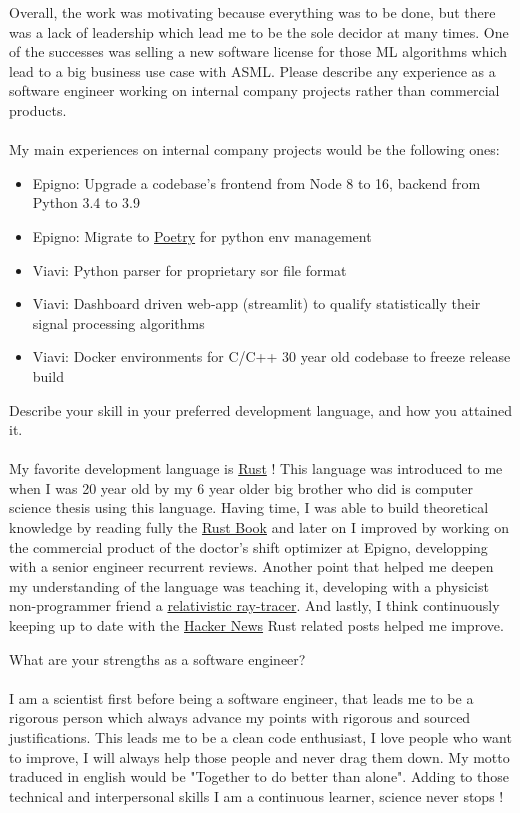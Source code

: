 \documentclass{exam}
\begin{document}
\begin{questions}
\begin{itemize}
\end{itemize}
Overall, the work was motivating because everything was to be done, but there was a lack of leadership which lead me to be the sole decidor at many times.
One of the successes was selling a new software license for those ML algorithms which lead to a big business use case with ASML.
\question Please describe any experience as a software engineer working on internal company projects rather than commercial products.
\\~\\
My main experiences on internal company projects would be the following ones:
\begin{itemize}
    \item Epigno: Upgrade a codebase’s frontend from Node 8 to 16, backend from Python 3.4 to 3.9
    \item Epigno: Migrate to \href{https://python-poetry.org/}{Poetry} for python env management
    \item Viavi: Python parser for proprietary sor file format
    \item Viavi: Dashboard driven web-app (streamlit) to qualify statistically their signal processing algorithms
    \item Viavi: Docker environments for C/C++ 30 year old codebase to freeze release build
\end{itemize}

\question Describe your skill in your preferred development language, and how you attained it.
\\~\\
My favorite development language is \href{https://www.rust-lang.org/fr}{Rust} !
This language was introduced to me when I was 20 year old by my 6 year older big brother who did is computer science thesis using this language.
Having time, I was able to build theoretical knowledge by reading fully the \href{https://doc.rust-lang.org/book/}{Rust Book} and later on I improved
by working on the commercial product of the doctor’s shift optimizer at Epigno, developping with a senior engineer recurrent reviews.
Another point that helped me deepen my understanding of the language was teaching it, developing with a physicist non-programmer friend
 a \href{https://github.com/Aboussejra/relativistic_ray_tracing}{relativistic ray-tracer}. And lastly, I think continuously keeping up to date 
 with the \href{https://news.ycombinator.com/news}{Hacker News} Rust related posts helped me improve.

\question What are your strengths as a software engineer?
\\~\\
I am a scientist first before being a software engineer, that leads me to be a rigorous person which always advance my points with rigorous and sourced justifications.
This leads me to be a clean code enthusiast, I love people who want to improve, I will always help those people and never drag them down.
My motto traduced in english would be "Together to do better than alone".
Adding to those technical and interpersonal skills I am a continuous learner, science never stops !


\end{questions}
\end{document}
